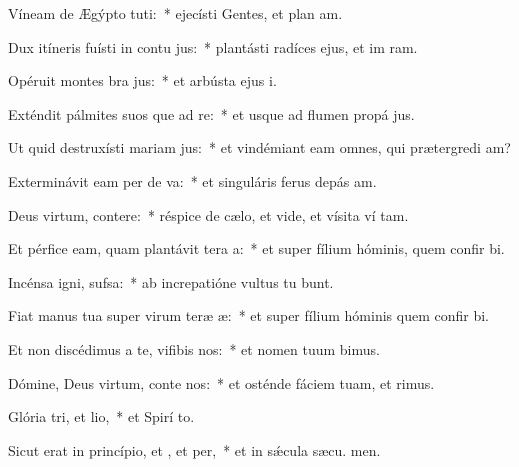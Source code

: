 \item Víneam de Ægýpto tuti:~* ejecísti Gentes, et plan am.
\item Dux itíneris fuísti in contu jus:~* plantásti radíces ejus, et im ram.
\item Opéruit montes bra jus:~* et arbústa ejus  i.
\item Exténdit pálmites suos que ad re:~* et usque ad flumen propá jus.
\item Ut quid destruxísti mariam jus:~* et vindémiant eam omnes, qui prætergredi am?
\item Exterminávit eam per de va:~* et singuláris ferus depás  am.
\item Deus virtum, contere:~* réspice de cælo, et vide, et vísita ví tam.
\item Et pérfice eam, quam plantávit tera a:~* et super fílium hóminis, quem confir bi.
\item Incénsa igni,  sufsa:~* ab increpatióne vultus tu bunt.
\item Fiat manus tua super virum teræ æ:~* et super fílium hóminis quem confir bi.
\item Et non discédimus a te, vifibis nos:~* et nomen tuum bimus.
\item Dómine, Deus virtum, conte nos:~* et osténde fáciem tuam, et  rimus.
\item Glória tri, et lio,~* et Spirí to.
\item Sicut erat in princípio, et , et per,~* et in sǽcula sæcu. men.

